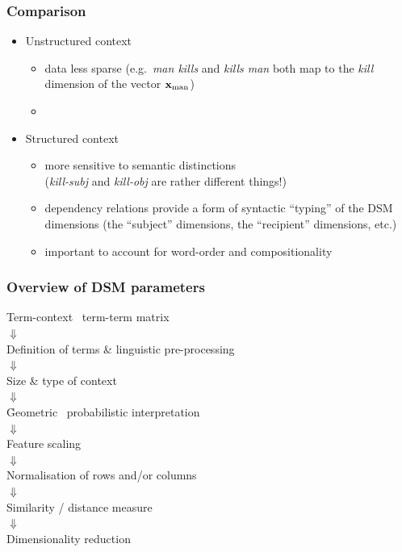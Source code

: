 \begin{frame}
  \frametitle{Comparison}

  \begin{itemize}
  \item Unstructured context
    \begin{itemize}
    \item data less sparse (e.g.\ \emph{man kills} and \emph{kills man} both
      map to the \emph{kill} dimension of the vector $\vx_{\text{man}}$)
    \item[]
    \end{itemize}
  \item Structured context
    \begin{itemize}
    \item more sensitive to semantic distinctions\\
      (\emph{kill-subj} and \emph{kill-obj} are rather different
      things!)
    \item dependency relations provide a form of syntactic ``typing''
      of the DSM dimensions (the ``subject'' dimensions, the
      ``recipient'' dimensions, etc.)
     \item important to account for word-order and compositionality 
    \end{itemize}
  \end{itemize}
\end{frame}

\begin{frame}
  \frametitle{Overview of DSM parameters}

  \ungap[1]
  \begin{center}
    Term-context \vs\ term-term matrix\\
    $\Downarrow$\\
    Definition of terms \& linguistic pre-processing\\
    $\Downarrow$\\
    Size \& type of context\\
    $\Downarrow$\\
    \h{Geometric \vs\ probabilistic interpretation}\\
    $\Downarrow$\\
    Feature scaling\\
    $\Downarrow$\\
    Normalisation of rows and/or columns\\
    $\Downarrow$\\
    Similarity / distance measure\\
    $\Downarrow$\\
    Dimensionality reduction
  \end{center}
\end{frame}

